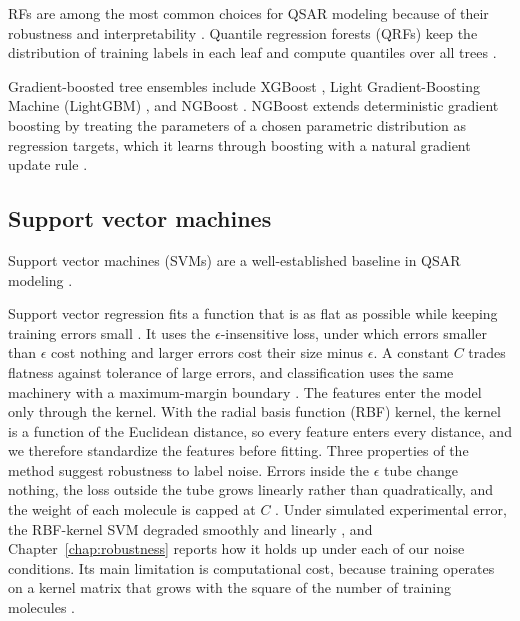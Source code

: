 RFs are among the most common choices for QSAR modeling because of their robustness and interpretability \citep{Svetnik2003}. Quantile regression forests (QRFs) keep the distribution of training labels in each leaf and compute quantiles over all trees \citep{Meinshausen2006}.

Gradient-boosted tree ensembles include XGBoost \citep{Mustapha2016, Tian2022}, Light Gradient-Boosting Machine (LightGBM) \citep{ke2017lightgbm}, and NGBoost \citep{Duan2020}. NGBoost extends deterministic gradient boosting by treating the parameters of a chosen parametric distribution as regression targets, which it learns through boosting with a natural gradient update rule \citep{Duan2020}.


\subsection{Support vector machines}

Support vector machines (SVMs) are a well-established baseline in QSAR modeling \citep{Vapnik1995, Svetnik2003}.

Support vector regression fits a function that is as flat as possible while keeping training errors small \citep{Vapnik1995, Smola2004}. It uses the $\epsilon$-insensitive loss, under which errors smaller than $\epsilon$ cost nothing and larger errors cost their size minus $\epsilon$. A constant $C$ trades flatness against tolerance of large errors, and classification uses the same machinery with a maximum-margin boundary \citep{Cortes1995}. The features enter the model only through the kernel. With the radial basis function (RBF) kernel, the kernel is a function of the Euclidean distance, so every feature enters every distance, and we therefore standardize the features before fitting. Three properties of the method suggest robustness to label noise. Errors inside the $\epsilon$ tube change nothing, the loss outside the tube grows linearly rather than quadratically, and the weight of each molecule is capped at $C$ \citep{Smola2004}. Under simulated experimental error, the RBF-kernel SVM degraded smoothly and linearly \citep{Cortes2015}, and Chapter~\ref{chap:robustness} reports how it holds up under each of our noise conditions. Its main limitation is computational cost, because training operates on a kernel matrix that grows with the square of the number of training molecules \citep{Chang2011}.


